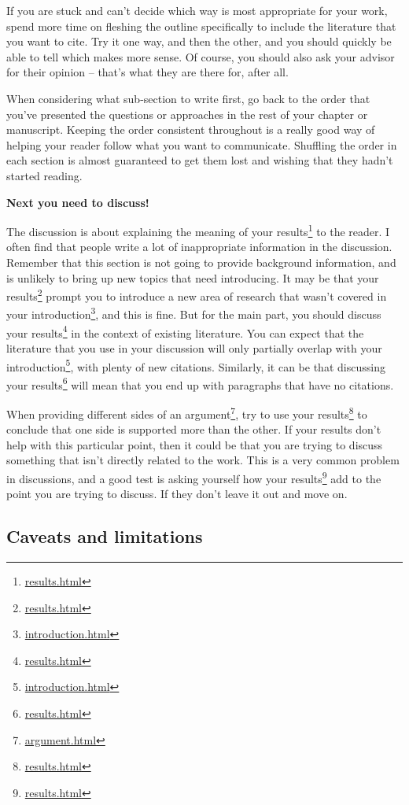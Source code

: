 \documentclass[
]{krantz}
\renewcommand{\href}[2]{#2\footnote{\url{#1}}}
\begin{document}
If you are stuck and can't decide which way is most appropriate for your work, spend more time on fleshing the outline specifically to include the literature that you want to cite. Try it one way, and then the other, and you should quickly be able to tell which makes more sense. Of course, you should also ask your advisor for their opinion -- that's what they are there for, after all.

When considering what sub-section to write first, go back to the order that you've presented the questions or approaches in the rest of your chapter or manuscript. Keeping the order consistent throughout is a really good way of helping your reader follow what you want to communicate. Shuffling the order in each section is almost guaranteed to get them lost and wishing that they hadn't started reading.

\textbf{Next you need to discuss!}

The discussion is about explaining the meaning of your \href{results.html}{results} to the reader. I often find that people write a lot of inappropriate information in the discussion. Remember that this section is not going to provide background information, and is unlikely to bring up new topics that need introducing. It may be that your \href{results.html}{results} prompt you to introduce a new area of research that wasn't covered in your \href{introduction.html}{introduction}, and this is fine. But for the main part, you should discuss your \href{results.html}{results} in the context of existing literature. You can expect that the literature that you use in your discussion will only partially overlap with your \href{introduction.html}{introduction}, with plenty of new citations. Similarly, it can be that discussing your \href{results.html}{results} will mean that you end up with paragraphs that have no citations.

When providing different sides of an \href{argument.html}{argument}, try to use your \href{results.html}{results} to conclude that one side is supported more than the other. If your results don't help with this particular point, then it could be that you are trying to discuss something that isn't directly related to the work. This is a very common problem in discussions, and a good test is asking yourself how your \href{results.html}{results} add to the point you are trying to discuss. If they don't leave it out and move on.

\hypertarget{caveats-and-limitations}{%
\subsection{Caveats and limitations}\label{caveats-and-limitations}}
\end{document}
